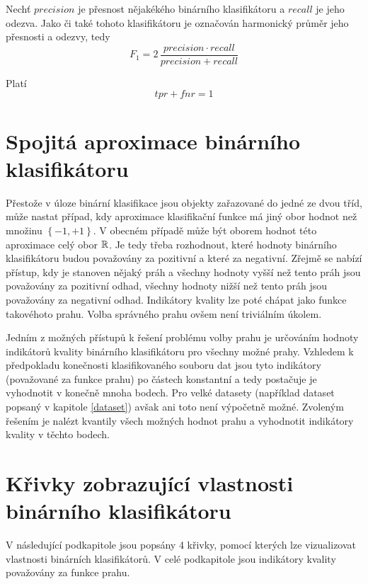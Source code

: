 \begin{define}
	Nechť \( precision \) je přesnost nějakékého binárního klasifikátoru a \( recall \) je jeho odezva. Jako  či také  tohoto klasifikátoru je označován harmonický průměr jeho přesnosti a odezvy, tedy
	\[ F_1 = 2 \, \frac{precision \cdot recall}{precision + recall} \]
\end{define}

\begin{theorem}\label{tpr+fnr}
	Platí
	\[ tpr + fnr = 1 \]
\end{theorem}

\section{Spojitá aproximace binárního klasifikátoru}

Přestože v úloze binární klasifikace jsou objekty zařazované do jedné ze dvou tříd, může nastat případ, kdy aproximace klasifikační funkce má jiný obor hodnot než množinu \( \left\{ -1, +1 \right\} \). V obecném případě může být oborem hodnot této aproximace celý obor \( \mathbb R \). Je tedy třeba rozhodnout, které hodnoty binárního klasifikátoru budou považovány za pozitivní a které za negativní. Zřejmě se nabízí přístup, kdy je stanoven nějaký práh a všechny hodnoty vyšší než tento práh jsou považovány za pozitivní odhad, všechny hodnoty nižší než tento práh jsou považovány za negativní odhad. Indikátory kvality lze poté chápat jako funkce takovéhoto prahu. Volba správného prahu ovšem není triviálním úkolem.

Jedním z možných přístupů k řešení problému volby prahu je určováním hodnoty indikátorů kvality binárního klasifikátoru pro všechny možné prahy. Vzhledem k předpokladu konečnosti klasifikovaného souboru dat jsou tyto indikátory (považované za funkce prahu) po částech konstantní a tedy postačuje je vyhodnotit v konečně mnoha bodech. Pro velké datasety (například dataset popsaný v kapitole \ref{dataset}) avšak ani toto není výpočetně možné. Zvoleným řešením je nalézt kvantily všech možných hodnot prahu a vyhodnotit indikátory kvality v těchto bodech.

\section{Křivky zobrazující vlastnosti binárního klasifikátoru}
V následující podkapitole jsou popsány 4 křivky, pomocí kterých lze vizualizovat vlastnosti binárních klasifikátorů. V celé podkapitole jsou indikátory kvality považovány za funkce prahu.

